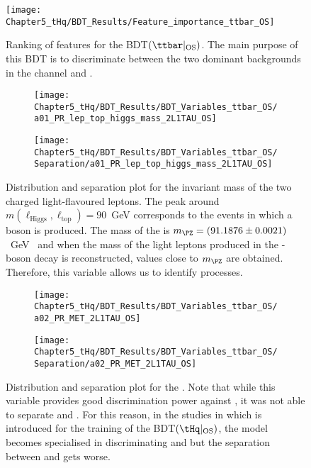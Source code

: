 \begin{figure}[h]
  \centering
  \texttt{[image: Chapter5\_tHq/BDT\_Results/Feature\_importance\_ttbar\_OS]}
\caption{Ranking of features for the BDT$(\ttbar |_{\text{OS}})$. The main purpose of this BDT is to discriminate
between the two dominant backgrounds in the \dilepOStau channel \ttbar and \Zjets.}
\label{fig:Appendix:BDTVARS:tHqOS:Feature_importance_ttbar_OS}
\end{figure}

\begin{figure}[h]
\centering
\begin{subfigure}{.45\textwidth}
  \centering
  \texttt{[image: Chapter5\_tHq/BDT\_Results/BDT\_Variables\_ttbar\_OS/a01\_PR\_lep\_top\_higgs\_mass\_2L1TAU\_OS]}
\end{subfigure}%
\begin{subfigure}{.55\textwidth}
  \centering
  \texttt{[image: Chapter5\_tHq/BDT\_Results/BDT\_Variables\_ttbar\_OS/Separation/a01\_PR\_lep\_top\_higgs\_mass\_2L1TAU\_OS]}
\end{subfigure}
\caption{Distribution and separation plot for the invariant mass of the two charged light-flavoured leptons.
The peak around $m(\ell_{\text{Higgs}}, \ell_{\text{top}})=90$~GeV corresponds to the events in which a 
\PZ boson is produced. The mass of the \PZ is $m_{\PZ} = (91.1876 \pm 0.0021)$~GeV~\cite{Workman:2022ynf} and %
when the mass of the light leptons produced in the \PZ-boson decay is reconstructed, values close
to $m_{\PZ}$ are obtained. Therefore, this variable allows us to identify \Zjets processes.}
\label{fig:Appendix:BDTVARS:ttbarOS:a01_PR_lep_top_higgs_mass}
\end{figure}

\begin{figure}[h]
\centering
\begin{subfigure}{.45\textwidth}
  \centering
  \texttt{[image: Chapter5\_tHq/BDT\_Results/BDT\_Variables\_ttbar\_OS/a02\_PR\_MET\_2L1TAU\_OS]}
\end{subfigure}%
\begin{subfigure}{.55\textwidth}
  \centering
  \texttt{[image: Chapter5\_tHq/BDT\_Results/BDT\_Variables\_ttbar\_OS/Separation/a02\_PR\_MET\_2L1TAU\_OS]}
\end{subfigure}
\caption{Distribution and separation plot for the \MET. Note that while this variable provides 
good discrimination power against \Zjets, it was not able to separate \ttbar and \tHq.
For this reason, in the studies in which \MET is introduced  for the training of the BDT$(\tHq|_{\text{OS}})$,
the model becomes specialised in discriminating \tHq and \Zjets but the separation between 
\tHq and \ttbar gets worse.} 
\label{fig:Appendix:BDTVARS:ttbarOS:a02_PR_MET}
\end{figure}

